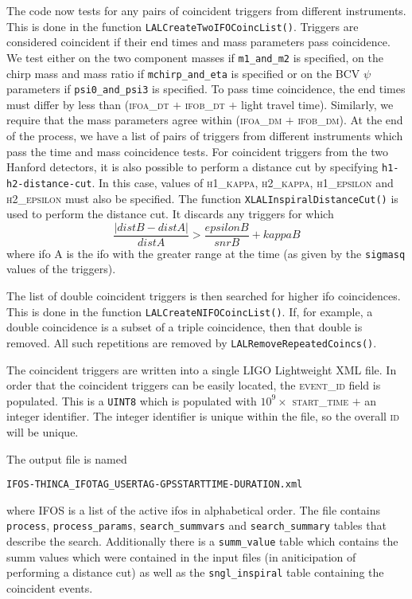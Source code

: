 \begin{entry}
The code now tests for any pairs of coincident triggers from different
instruments.  This is done in the function
\texttt{LALCreateTwoIFOCoincList()}.  Triggers are considered coincident if
their end times and mass parameters pass coincidence.  We test either on the
two component masses if \texttt{m1\_and\_m2} is specified, on the chirp mass
and mass ratio if \texttt{mchirp\_and\_eta} is specified or on the BCV $\psi$
parameters if \texttt{psi0\_and\_psi3} is specified.  To pass time
coincidence, the end times must differ by less than (\textsc{ifoa\_dt} $+$
\textsc{ifob\_dt} $+$ light travel time).  Similarly, we require that the mass
parameters agree within (\textsc{ifoa\_dm} $+$ \textsc{ifob\_dm}).  At the end
of the process, we have a list of pairs of triggers from different instruments
which pass the time and mass coincidence tests.  For coincident triggers from
the two Hanford detectors, it is also possible to perform a distance cut by
specifying \texttt{h1-h2-distance-cut}.  In this case, values of
\textsc{h1\_kappa}, \textsc{h2\_kappa}, \textsc{h1\_epsilon} and
\textsc{h2\_epsilon} must also be specified.  The function
\texttt{XLALInspiralDistanceCut()} is used to perform the distance cut.  It
discards any triggers for which 
%
\begin{equation}
\frac{|distB - distA|}{distA} > \frac{epsilonB}{snrB} + kappaB   
\end{equation}
%
where ifo A is the ifo with the greater range at the time (as given by the
\texttt{sigmasq} values of the triggers).

The list of double coincident triggers is then searched for higher ifo
coincidences.  This is done in the function \texttt{LALCreateNIFOCoincList()}.
If, for example, a double coincidence is a subset of a triple coincidence,
then that double is removed.  All such repetitions are removed by
\texttt{LALRemoveRepeatedCoincs()}.

The coincident triggers are written into a single LIGO Lightweight XML file.
In order that the coincident triggers can be easily located, the
\textsc{event\_id} field is populated.  This is a \texttt{UINT8} which is
populated with $10^{9} \times$ \textsc{start\_time} $+$ an integer identifier.
The integer identifier is unique within the file, so the overall \textsc{id}
will be unique.  

The output file is named
\begin{center}
\texttt{IFOS-THINCA\_IFOTAG\_USERTAG-GPSSTARTTIME-DURATION.xml}\\
\end{center}
where \textsc{IFOS} is a list of the active ifos in alphabetical order.  The
file contains \texttt{process}, \texttt{process\_params},
\texttt{search\_summvars} and \texttt{search\_summary} tables that describe
the search.  Additionally there is a \texttt{summ\_value} table which contains
the summ values which were contained in the input files (in aniticipation of
performing a distance cut) as well as the \texttt{sngl\_inspiral} table
containing the coincident events.


\end{entry}
